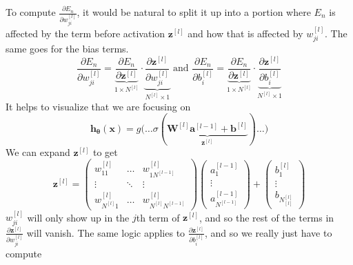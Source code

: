   \begin{algo}[Backpropagation]
    To compute $\frac{\partial E_n}{\partial w_{ji}^{[l]}}$, it would be natural to split it up into a portion where $E_n$ is affected by the term before activation $\mathbf{z}^{[l]}$ and how that is affected by $w_{ji}^{[l]}$. The same goes for the bias terms. 
    \begin{equation}
      \frac{\partial E_n}{\partial w_{ji}^{[l]}} = \underbrace{\frac{\partial E_n}{\partial \mathbf{z}^{[l]}}}_{1 \times N^{[l]}} \cdot \underbrace{\frac{\partial \mathbf{z}^{[l]}}{\partial w_{ji}^{[l]}}}_{N^{[l]} \times 1} \text{ and } \frac{\partial E_n}{\partial b_{i}^{[l]}} = \underbrace{\frac{\partial E_n}{\partial \mathbf{z}^{[l]}}}_{1 \times N^{[l]}} \cdot \underbrace{\frac{\partial \mathbf{z}^{[l]}}{\partial b_{i}^{[l]}}}_{N^{[l]} \times 1}
    \end{equation}
    It helps to visualize that we are focusing on 
    \begin{equation}
      \mathbf{h}_{\boldsymbol{\theta}} (\mathbf{x}) = g\big( \ldots \sigma( \underbrace{\mathbf{W}^{[l]} \mathbf{a}^{[l-1]} + \mathbf{b}^{[l]}}_{\mathbf{z}^{[l]}} )  \ldots \big)
    \end{equation}
    We can expand $\mathbf{z}^{[l]}$ to get 
    \begin{equation}
      \mathbf{z}^{[l]} = \begin{pmatrix} w_{11}^{[l]} & \ldots & w_{1 N^{[l-1]}}^{[l]} \\ \vdots & \ddots & \vdots \\ w_{N^{[l]} 1}^{[l]} & \ldots & w_{N^{[l]} N^{[l-1]}}^{[l]} \end{pmatrix} 
      \begin{pmatrix} a^{[l-1]}_1 \\ \vdots \\ a^{[l-1]}_{N^{[l-1]}} \end{pmatrix} + \begin{pmatrix} b_1^{[l]} \\ \vdots \\ b_{N^{[l]}_{[l]}} \end{pmatrix}
    \end{equation}
    $w_{ji}^{[l]}$ will only show up in the $j$th term of $\mathbf{z}^{[l]}$, and so the rest of the terms in $\frac{\partial \mathbf{z}^{[l]}}{\partial w_{ji}^{[l]}}$ will vanish. The same logic applies to $\frac{\partial \mathbf{z}^{[l]}}{\partial b_{i}^{[l]}}$, and so we really just have to compute 
    \begin{equation}

\end{equation}
\end{algo}
